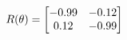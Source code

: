 \documentclass[preview]{standalone}
\begin{document}
\begin{align*}
\special{dvisvgm:raw <g id='unique000'>}R(\theta) = \begin{bmatrix}-0.99 & -0.12\\0.12 & -0.99\end{bmatrix}\special{dvisvgm:raw </g>}
\end{align*}
\end{document}
